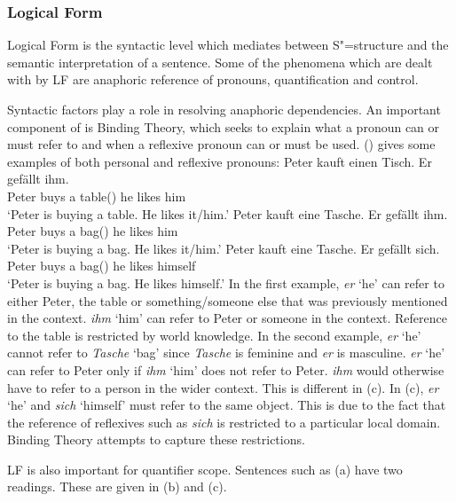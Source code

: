 \subsubsection{Logical Form}

Logical Form is the syntactic level which mediates between S"=structure and the semantic interpretation of
a sentence. Some of the phenomena which are dealt with by LF are anaphoric reference of pronouns, quantification and control. 

Syntactic factors\label{Seite-Bindungstheorie} play a role in resolving anaphoric dependencies.
An important component of \gbt is Binding Theory, which seeks to explain what a
pronoun can or must refer to and when a reflexive pronoun can or must be used. 
() gives some examples of both personal and reflexive pronouns:
\eal
\ex 
\gll Peter kauft einen Tisch. Er gefällt ihm.\\
	 Peter buys a table(\mas) he likes him\\
\glt `Peter is buying a table. He likes it/him.'
\ex 
\gll Peter kauft eine Tasche. Er gefällt ihm.\\
	 Peter buys a bag(\fem) he likes him\\
\glt `Peter is buying a bag. He likes it/him.'
\ex 
\gll Peter kauft eine Tasche. Er gefällt sich.\\
	 Peter buys a bag(\fem) he likes himself\\
\glt `Peter is buying a bag. He likes himself.'
\zl
\addlines[2]
In the first example, \emph{er} `he' can refer to either Peter, the table or something/someone else that was previously mentioned
in the context. \emph{ihm} `him' can refer to Peter or someone in the context. Reference to the table is restricted by world knowledge.
In the second example, \emph{er} `he' cannot refer to \emph{Tasche} `bag' since \emph{Tasche} is feminine and \emph{er} is masculine.
\emph{er} `he' can refer to Peter only if \emph{ihm} `him' does not refer to Peter. \emph{ihm} would otherwise have to refer to a person
in the wider context. This is different in (c). In (c), \emph{er} `he' and \emph{sich} `himself' must refer to the same
object. This is due to the fact that the reference of reflexives such as \emph{sich} is restricted to a particular local domain. Binding Theory
attempts to capture these restrictions.

LF is also important for quantifier scope. Sentences such as (a) have two readings. These are given in (b) and (c).

